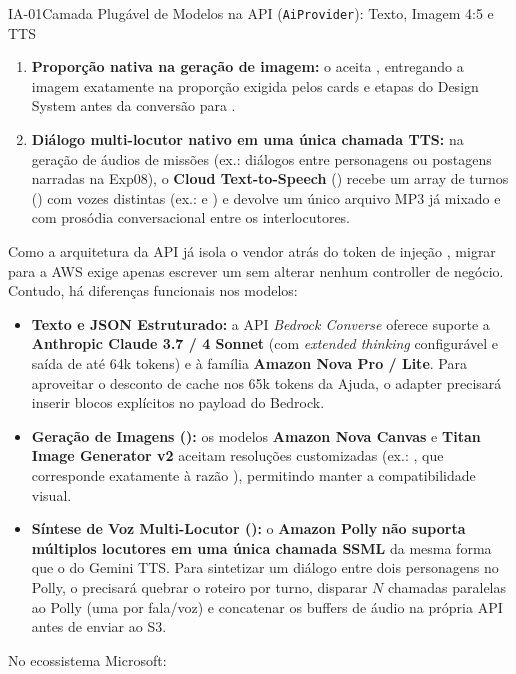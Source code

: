 \begin{pecaarq}{IA-01}{Camada Plugável de Modelos na API (\texttt{AiProvider}): Texto, Imagem 4:5 e TTS}{\sgcp~\nativo\enspace\saws~\adaptacao\enspace\sazure~\equivalente}
\begin{campos}
\begin{enumerate}
    \item \textbf{Proporção nativa  na geração de imagem:} o  aceita , entregando a imagem exatamente na proporção exigida pelos cards e etapas do Design System antes da conversão para .
    \item \textbf{Diálogo multi-locutor nativo em uma única chamada TTS:} na geração de áudios de missões (ex.: diálogos entre personagens ou postagens narradas na Exp08), o \textbf{Cloud Text-to-Speech} () recebe um array de turnos () com vozes distintas (ex.:  e ) e devolve um único arquivo MP3 já mixado e com prosódia conversacional entre os interlocutores.
  \end{enumerate}
  \item[Equivalente AWS] Como a arquitetura da API já isola o vendor atrás do token de injeção , migrar para a AWS exige apenas escrever um  sem alterar nenhum controller de negócio. Contudo, há diferenças funcionais nos modelos:
  \begin{itemize}
    \item \textbf{Texto e JSON Estruturado:} a API \emph{Bedrock Converse} oferece suporte a \textbf{Anthropic Claude 3.7 / 4 Sonnet} (com \emph{extended thinking} configurável e saída de até 64k tokens) e à família \textbf{Amazon Nova Pro / Lite}. Para aproveitar o desconto de cache nos 65k tokens da Ajuda, o adapter precisará inserir blocos explícitos  no payload do Bedrock.
    \item \textbf{Geração de Imagens ():} os modelos \textbf{Amazon Nova Canvas} e \textbf{Titan Image Generator v2} aceitam resoluções customizadas (ex.: , que corresponde exatamente à razão ), permitindo manter a compatibilidade visual.
    \item \textbf{Síntese de Voz Multi-Locutor (\adaptacao):} o \textbf{Amazon Polly} \textbf{não suporta múltiplos locutores em uma única chamada SSML} da mesma forma que o  do Gemini TTS. Para sintetizar um diálogo entre dois personagens no Polly, o  precisará quebrar o roteiro por turno, disparar $N$ chamadas paralelas ao Polly (uma por fala/voz) e concatenar os buffers de áudio na própria API antes de enviar ao S3.
  \end{itemize}
  \item[Equivalente Azure] No ecossistema Microsoft:

\end{campos}
\end{pecaarq}
